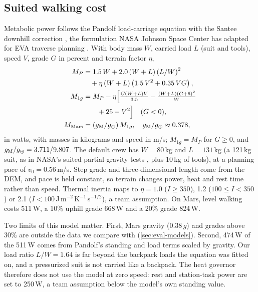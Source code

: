 \subsection{Suited walking cost}
\label{sec:cost}
Metabolic power follows the Pandolf load-carriage equation \citep{pandolf1977} with the Santee downhill correction \citep{santee2001}, the formulation NASA Johnson Space Center has adapted for EVA traverse planning \citep{kim2024metabolic}. With body mass $W$, carried load $L$ (suit and tools), speed $V$, grade $G$ in percent and terrain factor $\eta$,
\begin{align}
  M_P &= 1.5\,W + 2.0\,(W+L)\left(L/W\right)^{2} \nonumber\\
      &\quad + \eta\,(W+L)\left(1.5\,V^{2} + 0.35\,V G\right), \label{eq:pandolf}\\
  M_{1g} &= M_P - \eta\Big[\tfrac{G(W+L)V}{3.5} - \tfrac{(W+L)(G+6)^{2}}{W} \nonumber\\
      &\qquad + 25 - V^{2}\Big] \quad (G<0), \label{eq:santee}\\
  M_{\text{Mars}} &= \left(g_{\mathrm{M}}/g_{\oplus}\right) M_{1g}, \quad g_{\mathrm{M}}/g_{\oplus} \approx 0.378, \label{eq:gscale}
\end{align}
in watts, with masses in kilograms and speed in m/s; $M_{1g}=M_P$ for $G\ge0$, and $g_{\mathrm{M}}/g_\oplus=3.711/9.807$. The default crew has $W=80$\,kg and $L=131$\,kg (a 121\,kg suit, as in NASA's suited partial-gravity tests \citep{norcross2010incline}, plus 10\,kg of tools), at a planning pace of $v_0=0.56$\,m/s. Step grade and three-dimensional length come from the DEM, and pace is held constant, so terrain changes power, heat and rest time rather than speed. Thermal inertia maps to $\eta=1.0$ ($I\ge350$), 1.2 ($100\le I<350$) or 2.1 ($I<100$\,J\,m$^{-2}$\,K$^{-1}$\,s$^{-1/2}$), a team assumption. On Mars, level walking costs 511\,W, a 10\% uphill grade 668\,W and a 20\% grade 824\,W.

Two limits of this model matter. First, Mars gravity (0.38\,$g$) and grades above 30\% are outside the data we compare with (\cref{sec:eval-models}). Second, 474\,W of the 511\,W comes from Pandolf's standing and load terms scaled by gravity. Our load ratio $L/W=1.64$ is far beyond the backpack loads the equation was fitted on, and a pressurized suit is not carried like a backpack. The heat governor therefore does not use the model at zero speed: rest and station-task power are set to 250\,W, a team assumption below the model's own standing value.

